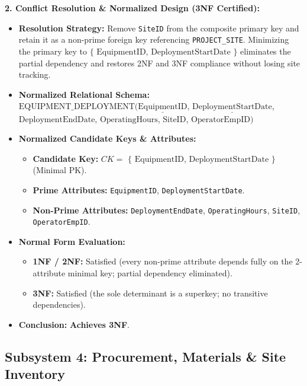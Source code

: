 \documentclass[a4paper,12pt]{report}
\begin{document}
\textbf{2. Conflict Resolution \& Normalized Design (3NF Certified):}

\begin{itemize}
\item
  \textbf{Resolution Strategy:} Remove \texttt{SiteID} from the composite primary key and retain it as a non-prime foreign key referencing \texttt{PROJECT\_\allowbreak{}SITE}. Minimizing the primary key to \(\{\) \(\text{EquipmentID}\), \(\text{DeploymentStartDate}\) \(\}\) eliminates the partial dependency and restores 2NF and 3NF compliance without losing site tracking.
\item
  \textbf{Normalized Relational Schema:} \(\text{EQUIPMENT\_DEPLOYMENT}(\underline{\text{EquipmentID}}\), \(\underline{\text{DeploymentStartDate}}\), \(\text{DeploymentEndDate}\), \(\text{OperatingHours}\), \(\text{SiteID}\), \(\text{OperatorEmpID})\)
\item
  \textbf{Normalized Candidate Keys \& Attributes:}

  \begin{itemize}
  \item
    \textbf{Candidate Key:} \(CK =\) \(\{\) \(\text{EquipmentID}\), \(\text{DeploymentStartDate}\) \(\}\) (Minimal PK).
  \item
    \textbf{Prime Attributes:} \texttt{EquipmentID}, \texttt{DeploymentStartDate}.
  \item
    \textbf{Non-Prime Attributes:} \texttt{DeploymentEndDate}, \texttt{OperatingHours}, \texttt{SiteID}, \texttt{OperatorEmpID}.
  \end{itemize}
\item
  \textbf{Normal Form Evaluation:}

  \begin{itemize}
  \item
    \textbf{1NF / 2NF:} Satisfied (every non-prime attribute depends fully on the 2-attribute minimal key; partial dependency eliminated).
  \item
    \textbf{3NF:} Satisfied (the sole determinant is a superkey; no transitive dependencies).
  \end{itemize}
\item
  \textbf{Conclusion:} \textbf{Achieves 3NF}.
\end{itemize}

\subsection{Subsystem 4: Procurement, Materials \& Site Inventory}\label{subsystem-4-procurement-materials-site-inventory}
\end{document}
